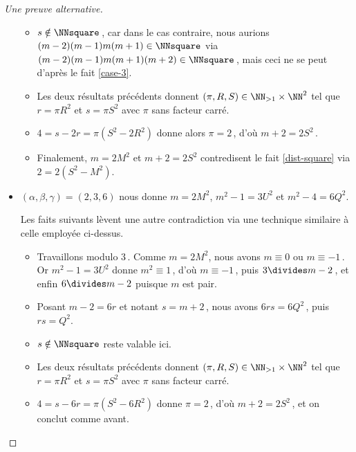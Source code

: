 \begin{proof}[Une preuve alternative]
\begin{itemize}
\begin{itemize}
			\item $s \notin \NNsquare$\,, car dans le cas contraire, nous aurions $(m-2)(m-1)m(m+1) \in \NNsquare$ via $(m-2)(m-1)m(m+1)(m+2)  \in \NNsquare$\,, mais ceci ne se peut d'après le fait \ref{case-3}.
			
			\item Les deux résultats précédents donnent $(\pi, R, S) \in \NN_{>1} \times \NN^2$ tel que $r = \pi R^2$ et $s = \pi S^2$ avec $\pi$ sans facteur carré.
			
			\item $4 = s - 2r = \pi (S^2 - 2 R^2)$ donne alors $\pi = 2$\,, d'où $m + 2 = 2 S^2$\,.
			
			\item Finalement, $m = 2 M^2$ et $m + 2 = 2 S^2$ contredisent le fait \ref{dist-square} via $2 = 2(S^2 - M^2)$.
		\end{itemize}



		\item $(\alpha, \beta, \gamma) = (2, 3, 6)$ nous donne $m = 2 M^2$, $m^2 - 1 = 3 U^2$ et $m^2 - 4 = 6 Q^2$.
		
		\noindent
		Les faits suivants lèvent une autre contradiction via une technique similaire à celle employée ci-dessus.
		\begin{itemize}
			\item Travaillons modulo $3$\,.
			Comme $m = 2 M^2$, nous avons $m \equiv 0$ ou $m \equiv -1$\,. 
			Or $m^2 - 1 = 3 U^2$ donne $m^2 \equiv 1$\,, d'où $m \equiv -1$\,, puis $3 \divides m - 2$\,, et enfin $6 \divides m - 2$ puisque $m$ est pair.
			
			\item Posant $m - 2 = 6 r$ et notant $s = m + 2$\,, nous avons $6 r s = 6 Q^2$\,, puis $r s = Q^2$.
			
			\item $s \notin \NNsquare$ reste valable ici.
			
			\item Les deux résultats précédents donnent $(\pi, R, S) \in \NN_{>1} \times \NN^2$ tel que $r = \pi R^2$ et $s = \pi S^2$ avec $\pi$ sans facteur carré.
			
			\item $4 = s - 6r = \pi (S^2 - 6 R^2)$ donne $\pi = 2$\,, d'où $m + 2 = 2 S^2$\,, et on conclut comme avant.
		\end{itemize}
	\end{itemize}
\end{proof}
